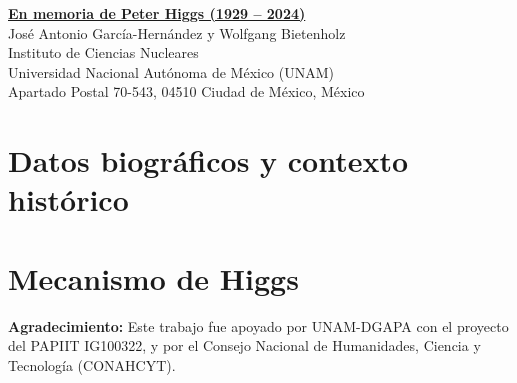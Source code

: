 \documentclass[12pt]{article}
\begin{document}
\begin{center}

{\Large{\underline{\bf En memoria de Peter Higgs (1929 -- 2024)}}} \vspace*{2mm} \vspace*{8mm} \\

{\small Jos\'e Antonio Garc\'ia-Hern\'andez y Wolfgang Bietenholz \\
  Instituto de Ciencias Nucleares \\
  Universidad Nacional Aut\'onoma de M\'exico (UNAM) \\
Apartado Postal 70-543, 04510 Ciudad de M\'exico, M\'exico}
 \vspace*{6mm} \\

\end{center}

\noindent


\section{Datos biogr\'aficos y contexto hist\'orico}



\section{Mecanismo de Higgs}



\noindent
{\bf Agradecimiento:} Este trabajo fue apoyado por UNAM-DGAPA
con el proyecto del PAPIIT IG100322, y por el Consejo Nacional de
Humanidades, Ciencia y Tecnología (CONAHCYT).


\end{document}
